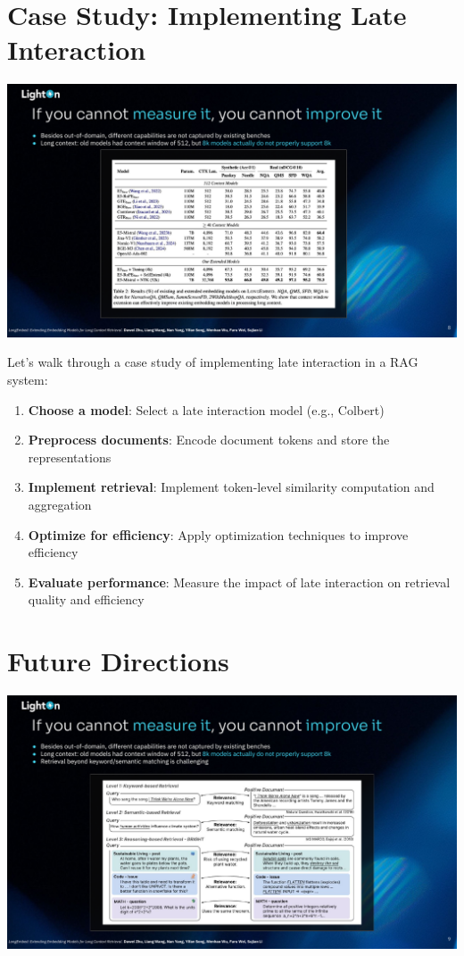 \documentclass[
  letterpaper,
  oneside]{scrbook}
\providecommand{\tightlist}{%
  \setlength{\itemsep}{0pt}\setlength{\parskip}{0pt}}\usepackage{longtable,booktabs,array}
\begin{document}
\section{Case Study: Implementing Late
Interaction}\label{case-study-implementing-late-interaction}

\includegraphics{chapters/../p4-images/slide_8.png}

Let's walk through a case study of implementing late interaction in a
RAG system:

\begin{enumerate}
\def\labelenumi{\arabic{enumi}.}
\tightlist
\item
  \textbf{Choose a model}: Select a late interaction model (e.g.,
  Colbert)
\item
  \textbf{Preprocess documents}: Encode document tokens and store the
  representations
\item
  \textbf{Implement retrieval}: Implement token-level similarity
  computation and aggregation
\item
  \textbf{Optimize for efficiency}: Apply optimization techniques to
  improve efficiency
\item
  \textbf{Evaluate performance}: Measure the impact of late interaction
  on retrieval quality and efficiency
\end{enumerate}

\section{Future Directions}\label{future-directions-1}

\includegraphics{chapters/../p4-images/slide_9.png}
\end{document}
